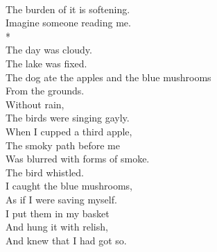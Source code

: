 \documentclass[smalldemyvopaper,11pt,twoside,onecolumn,openright,extrafontsizes]{memoir}
\begin{document}
\\The burden of it is softening.
\\Imagine someone reading me.
\\*
\\The day was cloudy.
\\The lake was fixed.
\\The dog ate the apples and the blue mushrooms
\\From the grounds.
\\Without rain,
\\The birds were singing gayly.
\\When I cupped a third apple,
\\The smoky path before me
\\Was blurred with forms of smoke.
\\The bird whistled.
\\I caught the blue mushrooms,
\\As if I were saving myself.
\\I put them in my basket
\\And hung it with relish,
\\And knew that I had got so.
\end{document}
